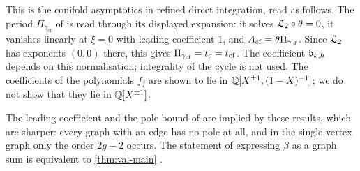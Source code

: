 This is the conifold asymptotics in refined direct integration, read as follows. The period $\Pi_{\gamma_{\mathrm{cf}}}$ of \cite{BS} is read through its displayed expansion: it solves $\mathcal{L}_{2}\circ\theta=0$, it vanishes linearly at $\xi=0$ with leading coefficient $1$, and $A_{\mathrm{cf}}=\theta\Pi_{\gamma_{\mathrm{cf}}}$. Since $\mathcal{L}_{2}$ has exponents $(0,0)$ there, this gives $\Pi_{\gamma_{\mathrm{cf}}}=t_{\mathrm{c}}=t_{\mathrm{cf}}$. The coefficient $\mathfrak{b}_{k,h}$ depends on this normalisation; integrality of the cycle is not used. The coefficients of the polynomials $f_j$ are shown to lie in $\mathbb{Q}[X^{\pm1},(1-X)^{-1}]$; we do not show that they lie in $\mathbb{Q}[X^{\pm1}]$.

The leading coefficient and the pole bound of \cite{BS} are implied by these results, which are sharper: every graph with an edge has no pole at all, and in the single-vertex graph only the order $2g-2$ occurs. The statement of \cite{BS} expressing $\beta$ as a graph sum is equivalent to \cref{thm:val-main} .

